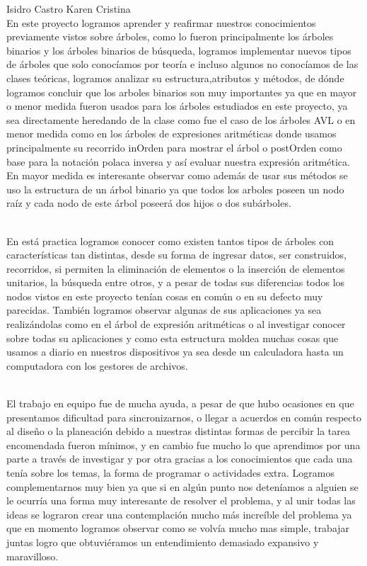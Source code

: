 \documentclass{report}
\begin{document}
Isidro Castro Karen Cristina\\
En este proyecto logramos aprender y reafirmar nuestros conocimientos previamente vistos sobre árboles, como lo fueron principalmente los árboles binarios y los árboles binarios de búsqueda, logramos implementar nuevos tipos de árboles que solo conocíamos por teoría e incluso algunos no conocíamos de las clases teóricas, logramos analizar su estructura,atributos y métodos, de dónde logramos concluir que los arboles binarios son muy importantes ya que en mayor o menor medida fueron usados para los árboles estudiados en este proyecto, ya sea directamente heredando de la clase como fue el caso de los árboles AVL o en menor medida como en los árboles de expresiones aritméticas donde usamos principalmente su recorrido inOrden para mostrar el árbol o postOrden como base para la notación polaca inversa y así evaluar nuestra expresión aritmética. En mayor medida es interesante observar como además de usar sus métodos se uso la estructura de un árbol binario ya que todos los arboles poseen un nodo raíz y cada nodo de este árbol poseerá dos hijos o dos subárboles.\\\

En está practica logramos conocer como existen tantos tipos de árboles con características tan distintas, desde su forma de ingresar datos, ser construidos, recorridos, si permiten la eliminación de elementos o la inserción de elementos unitarios, la búsqueda entre otros, y a pesar de todas sus diferencias todos los nodos vistos en este proyecto tenían cosas en común o en su defecto muy parecidas. También logramos observar algunas de sus aplicaciones ya sea realizándolas como en el árbol de expresión aritméticas o al investigar conocer sobre todas su aplicaciones y como esta estructura moldea muchas cosas que usamos a diario en nuestros dispositivos ya sea desde un calculadora hasta un computadora con los gestores de archivos.\\\

El trabajo en equipo fue de mucha ayuda, a pesar de que hubo ocasiones en que presentamos dificultad para sincronizarnos, o llegar a acuerdos en común respecto al diseño o la planeación debido a nuestras distintas formas de percibir la tarea encomendada fueron mínimos, y en cambio fue mucho lo que aprendimos por una parte a través de investigar y por otra gracias a los conocimientos que cada una tenía sobre los temas, la forma de programar o actividades extra. Logramos complementarnos muy bien ya que si en algún punto nos deteníamos a alguien se le ocurría una forma muy interesante de resolver el problema, y al unir todas las ideas se lograron crear una contemplación mucho más increíble del problema ya que en momento logramos observar como se volvía mucho mas simple, trabajar juntas logro que obtuviéramos un entendimiento demasiado expansivo y maravilloso.\\\
\end{document}
